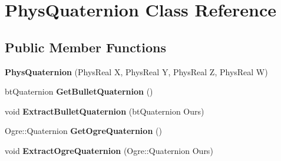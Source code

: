 \hypertarget{classPhysQuaternion}{
\section{PhysQuaternion Class Reference}
\label{d5/d19/classPhysQuaternion}
}
\subsection*{Public Member Functions}
\begin{DoxyCompactItemize}
\item 
\hypertarget{classPhysQuaternion_aa0cbd53e7a9e624a3f0f22aa94618e17}{
{\bfseries PhysQuaternion} (PhysReal X, PhysReal Y, PhysReal Z, PhysReal W)}
\label{d5/d19/classPhysQuaternion_aa0cbd53e7a9e624a3f0f22aa94618e17}

\item 
\hypertarget{classPhysQuaternion_a63ed0cf13cd77d8e89af9748db2e4893}{
btQuaternion {\bfseries GetBulletQuaternion} ()}
\label{d5/d19/classPhysQuaternion_a63ed0cf13cd77d8e89af9748db2e4893}

\item 
\hypertarget{classPhysQuaternion_a112b979d18c915cb719781949d74ff83}{
void {\bfseries ExtractBulletQuaternion} (btQuaternion Ours)}
\label{d5/d19/classPhysQuaternion_a112b979d18c915cb719781949d74ff83}

\item 
\hypertarget{classPhysQuaternion_a30adc9ec3604da6ac9df49dc25b6fd31}{
Ogre::Quaternion {\bfseries GetOgreQuaternion} ()}
\label{d5/d19/classPhysQuaternion_a30adc9ec3604da6ac9df49dc25b6fd31}

\item 
\hypertarget{classPhysQuaternion_a63dd5036c86a5353094ad7b089ede3ab}{
void {\bfseries ExtractOgreQuaternion} (Ogre::Quaternion Ours)}
\label{d5/d19/classPhysQuaternion_a63dd5036c86a5353094ad7b089ede3ab}

\end{DoxyCompactItemize}
